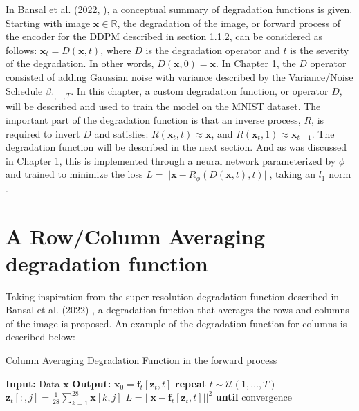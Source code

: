 \documentclass[12pt]{report} %
\begin{document}
In Bansal et al. (2022, \cite{bansal2022cold}), a conceptual summary of degradation functions is given. Starting with image $\mathbf{x} \in \mathbb{R}$, the degradation of the image, or forward process of the encoder for the DDPM described in section 1.1.2, can be considered as follows: $\mathbf{x}_{t} = D(\mathbf{x}, t)$, where $D$ is the degradation operator and $t$ is the severity of the degradation. In other words, $D(\mathbf{x}, 0) = \mathbf{x}$. In Chapter 1, the $D$ operator consisted of adding Gaussian noise with variance described by the Variance/Noise Schedule $\beta_{1, \dots, T}$. In this chapter, a custom degradation function, or operator $D$, will be described and used to train the model on the MNIST dataset. The important part of the degradation function is that an inverse process, $R$, is required to invert $D$ and satisfies: $R(\mathbf{x}_t, t) \approx \mathbf{x}$, and $R(\mathbf{x}_t, 1) \approx \mathbf{x}_{t-1}$. The degradation function will be described in the next section. And as was discussed in Chapter 1, this is implemented through a neural network parameterized by $\phi$ and trained to minimize the loss $L = ||\mathbf{x} - R_{\phi}(D(\mathbf{x}, t), t)||$, taking an $l_{1}$ norm \cite{bansal2022cold}.

\section{A Row/Column Averaging degradation function}

Taking inspiration from the super-resolution degradation function described in Bansal et al. (2022) \cite{bansal2022cold}, a degradation function that averages the rows and columns of the image is proposed. An example of the degradation function for columns is described below:

\begin{definitionbox}{Column Averaging Degradation Function in the forward process}
  \begin{algorithmic}
    \State \textbf{Input:} Data $\mathbf{x}$
    \State \textbf{Output:} $\mathbf{x}_{0} = \mathbf{f}_{t}[\mathbf{z}_{t}, t]$
    \State \textbf{repeat}
       
        \State $t \sim \mathcal{U}(1, \dots, T)$ 
         
          \State $\mathbf{z}_{t}[:, j] = \frac{1}{\text{28}}\sum_{k=1}^{28}\mathbf{x}[k, j]$
        \EndFor
        \State $L = ||\mathbf{x} - \mathbf{f}_{t}[\mathbf{z}_{t}, t]||^{2}$ 
      \EndFor {}
    \State \textbf{until} convergence
  \end{algorithmic}
\end{definitionbox}
\end{document}
